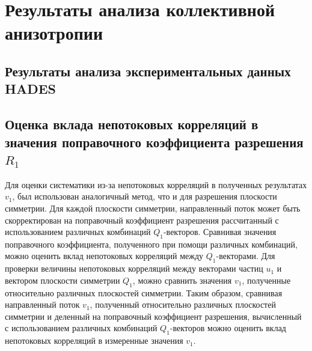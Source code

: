 \chapter{Результаты анализа коллективной анизотропии}

\section{Результаты анализа экспериментальных данных HADES}

\section{Оценка вклада непотоковых корреляций в значения поправочного коэффициента разрешения $R_1$}

Для оценки систематики из-за непотоковых корреляций в полученных результатах $v_1$, был использован аналогичный метод, что и для разрешения плоскости симметрии. 
Для каждой плоскости симметрии, направленный поток может быть скорректирован на поправочный коэффициент разрешения рассчитанный с использованием различных комбинаций $Q_1$-векторов.
Сравнивая значения поправочного коэффициента, полученного при помощи различных комбинаций, можно оценить вклад непотоковых корреляций между $Q_1$-векторами.
Для проверки величины непотоковых корреляций между векторами частиц $u_1$ и вектором плоскости симметрии $Q_1$, можно сравнить значения $v_1$, полученные относительно различных плоскостей симметрии.
Таким образом, сравнивая направленный поток $v_1$, полученный относительно различных плоскостей симметрии и деленный на поправочный коэффициент разрешения, вычисленный с использованием различных комбинаций $Q_1$-векторов можно оценить вклад непотоковых корреляций в измеренные значения $v_1$.

